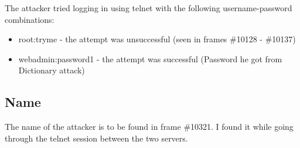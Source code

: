 The attacker tried logging in using telnet with the following username-password combinations:
\begin{itemize}
    \item root:tryme - the attempt was unsuccessful (seen in frames \#10128 - \#10137)
    \item webadmin:password1 - the attempt was successful (Password he got from Dictionary attack)
\end{itemize}

\subsection{Name}
The name of the attacker is to be found in frame \#10321.
I found it while going through the telnet session between the two servers.